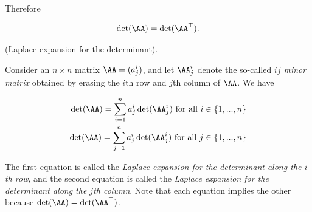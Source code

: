 \begin{deriv}
    Therefore
    
    \begin{align*}
        \det(\AA) = \det(\AA^\top).
    \end{align*}
\end{deriv}

\begin{theorem}
    (Laplace expansion for the determinant).
    
    Consider an $n \times n$ matrix $\AA = (a^i_j)$, and let $\AA^i_j$ denote the so-called \textit{$ij$ minor matrix} obtained by erasing the $i$th row and $j$th column of $\AA$. We have
    
    \begin{align*}
        \det(\AA) = \sum_{i = 1}^{n} a^i_j \det(\AA^i_j) \text{ for all $i \in \{1, ..., n\}$} \\
        \det(\AA) = \sum_{j = 1}^{n} a^i_j \det(\AA^i_j) \text{ for all $j \in \{1, ..., n\}$}
    \end{align*}
    
    The first equation is called the \textit{Laplace expansion for the determinant along the $i$th row}, and the second equation is called the \textit{Laplace expansion for the determinant along the $j$th column}. Note that each equation implies the other because $\det(\AA) = \det(\AA^\top)$.
\end{theorem}
    
